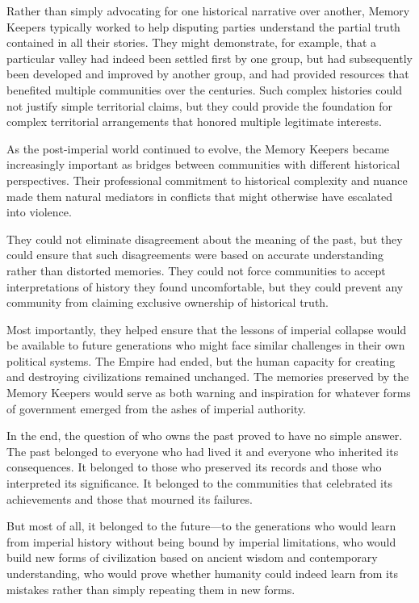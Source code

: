 Rather than simply advocating for one historical narrative over another,
Memory Keepers typically worked to help disputing parties understand the
partial truth contained in all their stories. They might demonstrate,
for example, that a particular valley had indeed been settled first by
one group, but had subsequently been developed and improved by another
group, and had provided resources that benefited multiple communities
over the centuries. Such complex histories could not justify simple
territorial claims, but they could provide the foundation for complex
territorial arrangements that honored multiple legitimate interests.

As the post-imperial world continued to evolve, the Memory Keepers
became increasingly important as bridges between communities with
different historical perspectives. Their professional commitment to
historical complexity and nuance made them natural mediators in
conflicts that might otherwise have escalated into violence.

They could not eliminate disagreement about the meaning of the past, but
they could ensure that such disagreements were based on accurate
understanding rather than distorted memories. They could not force
communities to accept interpretations of history they found
uncomfortable, but they could prevent any community from claiming
exclusive ownership of historical truth.

Most importantly, they helped ensure that the lessons of imperial
collapse would be available to future generations who might face similar
challenges in their own political systems. The Empire had ended, but the
human capacity for creating and destroying civilizations remained
unchanged. The memories preserved by the Memory Keepers would serve as
both warning and inspiration for whatever forms of government emerged
from the ashes of imperial authority.

In the end, the question of who owns the past proved to have no simple
answer. The past belonged to everyone who had lived it and everyone who
inherited its consequences. It belonged to those who preserved its
records and those who interpreted its significance. It belonged to the
communities that celebrated its achievements and those that mourned its
failures.

But most of all, it belonged to the future---to the generations who
would learn from imperial history without being bound by imperial
limitations, who would build new forms of civilization based on ancient
wisdom and contemporary understanding, who would prove whether humanity
could indeed learn from its mistakes rather than simply repeating them
in new forms.

